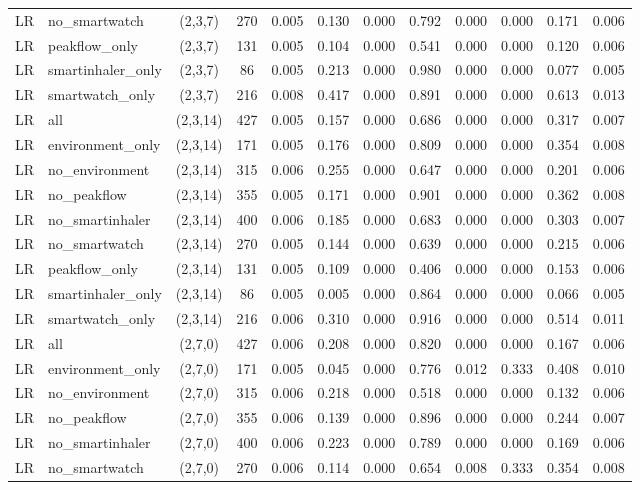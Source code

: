 \begin{longtable}{llcccccccccc}
LR & no\_smartwatch & (2,3,7) & 270 & 0.005 & 0.130 & 0.000 & 0.792 & 0.000 & 0.000 & 0.171 & 0.006 \\
LR & peakflow\_only & (2,3,7) & 131 & 0.005 & 0.104 & 0.000 & 0.541 & 0.000 & 0.000 & 0.120 & 0.006 \\
LR & smartinhaler\_only & (2,3,7) & 86 & 0.005 & 0.213 & 0.000 & 0.980 & 0.000 & 0.000 & 0.077 & 0.005 \\
LR & smartwatch\_only & (2,3,7) & 216 & 0.008 & 0.417 & 0.000 & 0.891 & 0.000 & 0.000 & 0.613 & 0.013 \\
LR & all & (2,3,14) & 427 & 0.005 & 0.157 & 0.000 & 0.686 & 0.000 & 0.000 & 0.317 & 0.007 \\
LR & environment\_only & (2,3,14) & 171 & 0.005 & 0.176 & 0.000 & 0.809 & 0.000 & 0.000 & 0.354 & 0.008 \\
LR & no\_environment & (2,3,14) & 315 & 0.006 & 0.255 & 0.000 & 0.647 & 0.000 & 0.000 & 0.201 & 0.006 \\
LR & no\_peakflow & (2,3,14) & 355 & 0.005 & 0.171 & 0.000 & 0.901 & 0.000 & 0.000 & 0.362 & 0.008 \\
LR & no\_smartinhaler & (2,3,14) & 400 & 0.006 & 0.185 & 0.000 & 0.683 & 0.000 & 0.000 & 0.303 & 0.007 \\
LR & no\_smartwatch & (2,3,14) & 270 & 0.005 & 0.144 & 0.000 & 0.639 & 0.000 & 0.000 & 0.215 & 0.006 \\
LR & peakflow\_only & (2,3,14) & 131 & 0.005 & 0.109 & 0.000 & 0.406 & 0.000 & 0.000 & 0.153 & 0.006 \\
LR & smartinhaler\_only & (2,3,14) & 86 & 0.005 & 0.005 & 0.000 & 0.864 & 0.000 & 0.000 & 0.066 & 0.005 \\
LR & smartwatch\_only & (2,3,14) & 216 & 0.006 & 0.310 & 0.000 & 0.916 & 0.000 & 0.000 & 0.514 & 0.011 \\
LR & all & (2,7,0) & 427 & 0.006 & 0.208 & 0.000 & 0.820 & 0.000 & 0.000 & 0.167 & 0.006 \\
LR & environment\_only & (2,7,0) & 171 & 0.005 & 0.045 & 0.000 & 0.776 & 0.012 & 0.333 & 0.408 & 0.010 \\
LR & no\_environment & (2,7,0) & 315 & 0.006 & 0.218 & 0.000 & 0.518 & 0.000 & 0.000 & 0.132 & 0.006 \\
LR & no\_peakflow & (2,7,0) & 355 & 0.006 & 0.139 & 0.000 & 0.896 & 0.000 & 0.000 & 0.244 & 0.007 \\
LR & no\_smartinhaler & (2,7,0) & 400 & 0.006 & 0.223 & 0.000 & 0.789 & 0.000 & 0.000 & 0.169 & 0.006 \\
LR & no\_smartwatch & (2,7,0) & 270 & 0.006 & 0.114 & 0.000 & 0.654 & 0.008 & 0.333 & 0.354 & 0.008 \\

\end{longtable}

